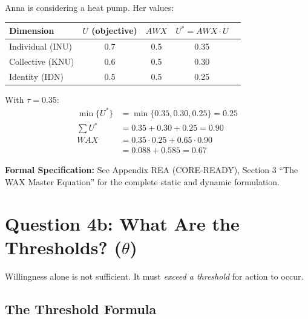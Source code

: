 \begin{example}
Anna is considering a heat pump. Her values:

\begin{center}
\begin{tabular}{lcccc}
\toprule
\textbf{Dimension} & $U$ (objective) & $AWX$ & $U^* = AWX \cdot U$ \\
\midrule
Individual (INU) & 0.7 & 0.5 & 0.35 \\
Collective (KNU) & 0.6 & 0.5 & 0.30 \\
Identity (IDN) & 0.5 & 0.5 & 0.25 \\
\bottomrule
\end{tabular}
\end{center}

With $\tau = 0.35$:
\begin{align}
\min\{U^*\} &= \min\{0.35, 0.30, 0.25\} = 0.25\\
\sum U^* &= 0.35 + 0.30 + 0.25 = 0.90\\
WAX &= 0.35 \cdot 0.25 + 0.65 \cdot 0.90\\
&= 0.088 + 0.585 = \mathbf{0.67}
\end{align}
\end{example}

\begin{cross-reference}
\textbf{Formal Specification:} See Appendix REA (CORE-READY), Section 3 ``The WAX Master
Equation'' for the complete static and dynamic formulation.
\end{cross-reference}



\section{Question 4b: What Are the Thresholds? ($\theta$)}
\label{sec:12-theta}


Willingness alone is not sufficient. It must \textit{exceed a threshold} for
action to occur.

\subsection{The Threshold Formula}

